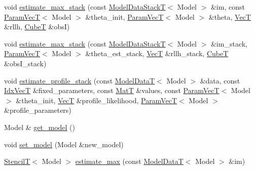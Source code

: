 \begin{DoxyCompactItemize}
void \hyperlink{classmappel_1_1ThreadedEstimator_afb7a2e27b4e8dcc2fa604f83344461fe}{estimate\+\_\+max\+\_\+stack} (const \hyperlink{namespacemappel_aaeb6665bc57476dd93c2df6ad8bc4768}{Model\+Data\+StackT}$<$ Model $>$ \&im, const \hyperlink{namespacemappel_a0f86d3153e4e27b095012f140eea58de}{Param\+VecT}$<$ Model $>$ \&theta\+\_\+init, \hyperlink{namespacemappel_a0f86d3153e4e27b095012f140eea58de}{Param\+VecT}$<$ Model $>$ \&theta, \hyperlink{namespacemappel_a2225ad69f358daa3f4f99282a35b9a3a}{VecT} \&rllh, \hyperlink{namespacemappel_ab2afab4e6c8805e83946670d882768c2}{CubeT} \&obsI)
\item 
void \hyperlink{classmappel_1_1Estimator_aa1b1c2677df2c6ea9fcf67b6a0856e46}{estimate\+\_\+max\+\_\+stack} (const \hyperlink{namespacemappel_aaeb6665bc57476dd93c2df6ad8bc4768}{Model\+Data\+StackT}$<$ Model $>$ \&im\+\_\+stack, \hyperlink{namespacemappel_a0f86d3153e4e27b095012f140eea58de}{Param\+VecT}$<$ Model $>$ \&theta\+\_\+est\+\_\+stack, \hyperlink{namespacemappel_a2225ad69f358daa3f4f99282a35b9a3a}{VecT} \&rllh\+\_\+stack, \hyperlink{namespacemappel_ab2afab4e6c8805e83946670d882768c2}{CubeT} \&obs\+I\+\_\+stack)
\item 
void \hyperlink{classmappel_1_1ThreadedEstimator_aebbf686f95be1331ff85cecd5a3c97db}{estimate\+\_\+profile\+\_\+stack} (const \hyperlink{namespacemappel_a97f050df953605381ae9c901c3b125f1}{Model\+DataT}$<$ Model $>$ \&data, const \hyperlink{namespacemappel_ac63743dcd42180127307cd0e4ecdd784}{Idx\+VecT} \&fixed\+\_\+parameters, const \hyperlink{namespacemappel_a7091ab87c528041f7e2027195fad8915}{MatT} \&values, const \hyperlink{namespacemappel_a0f86d3153e4e27b095012f140eea58de}{Param\+VecT}$<$ Model $>$ \&theta\+\_\+init, \hyperlink{namespacemappel_a2225ad69f358daa3f4f99282a35b9a3a}{VecT} \&profile\+\_\+likelihood, \hyperlink{namespacemappel_a0f86d3153e4e27b095012f140eea58de}{Param\+VecT}$<$ Model $>$ \&profile\+\_\+parameters)
\item 
Model \& \hyperlink{classmappel_1_1Estimator_a6c0b757d89033d70bdf03ad1fe6b03da}{get\+\_\+model} ()
\item 
void \hyperlink{classmappel_1_1Estimator_aacade4f66038545ad196edf7e8596187}{set\+\_\+model} (Model \&new\+\_\+model)
\item 
\hyperlink{namespacemappel_a3a06598240007876f8c4bf834ad86197}{StencilT}$<$ Model $>$ \hyperlink{classmappel_1_1Estimator_a4406c994d5b6239e75628ea5d479bfa2}{estimate\+\_\+max} (const \hyperlink{namespacemappel_a97f050df953605381ae9c901c3b125f1}{Model\+DataT}$<$ Model $>$ \&im)
\item 

\end{DoxyCompactItemize}
